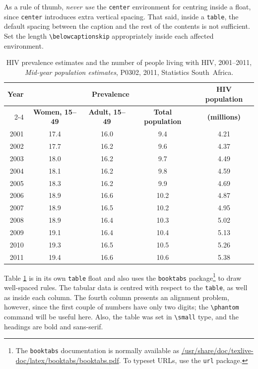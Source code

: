 \documentclass[10pt,a4paper]{article}
\newcommand{\thead}[1]{\textbf{\textsf{#1}}}
\theoremstyle{definition}
\begin{document}
    As a rule of thumb, \emph{never use} the \texttt{center} environment for centring inside
    a float, since \texttt{center} introduces extra vertical spacing. That said, inside a
    \texttt{table}, the default spacing between the caption and the rest of the contents
    is not sufficient. Set the length \verb$\belowcaptionskip$ appropriately inside each
    affected environment.
    
    \begin{table}[tb]
        \caption{
            HIV prevalence estimates and the number of people living with HIV,
            2001--2011, \emph{Mid-year population estimates}, P0302, 2011,
            Statistics South~Africa.
            }
            \small
            \begin{tabular}{rcccc}
                \toprule
                \thead{Year} & \multicolumn{3}{c}{\thead{Prevalence}} & \thead{HIV population} \\
                \cmidrule{2-4}
                \phantom{a} & \thead{Women, 15--49} & \thead{Adult, 15--49} &
				\thead{Total population} & \thead{(millions)} \\
                \midrule
                2001 & 17.4 & 16.0 & 9.4  & 4.21 \\
                2002 & 17.7 & 16.2 & 9.6  & 4.37 \\
                2003 & 18.0 & 16.2 & 9.7  & 4.49 \\
                2004 & 18.1 & 16.2 & 9.8  & 4.59 \\
                2005 & 18.3 & 16.2 & 9.9  & 4.69 \\
                2006 & 18.9 & 16.6 & 10.2 & 4.87 \\
                2007 & 18.9 & 16.5 & 10.2 & 4.95 \\
                2008 & 18.9 & 16.4 & 10.3 & 5.02 \\
                2009 & 19.1 & 16.4 & 10.4 & 5.13 \\
                2010 & 19.3 & 16.5 & 10.5 & 5.26 \\
                2011 & 19.4 & 16.6 & 10.6 & 5.38 \\
                \bottomrule
            \end{tabular}
            \label{table:hiv}
        \end{table}

    Table \ref{table:hiv} is in its own \texttt{table} float and also uses the \texttt{booktabs} package\footnote{
        The \texttt{booktabs} documentation is normally available as \url{/usr/share/doc/texlive-doc/latex/booktabs/booktabs.pdf}.
        To typeset URLs, use the \texttt{url} package.
    } to draw well-spaced rules. The tabular data is centred with respect to the \texttt{table},
    as well as inside each column. The fourth column presents an alignment problem,
    however, since the first couple of numbers have only two digits; the \verb$\phantom$
    command will be useful here. Also, the table was set in \verb$\small$ type, and the
    headings are bold and sans-serif.
\end{document}
